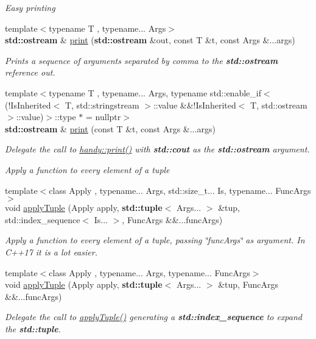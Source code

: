 {\bf }\par
{\em Easy printing }\begin{DoxyCompactItemize}
\item 
{\footnotesize template$<$typename T , typename... Args$>$ }\\{\bf std\+::ostream} \& \hyperlink{namespacehandy_a553ff960ee6b2b0142aecc9ed04ac6bc}{print} ({\bf std\+::ostream} \&out, const T \&t, const Args \&...args)
\begin{DoxyCompactList}\small\item\em Prints a sequence of arguments separated by comma to the {\bf std\+::ostream} reference {\ttfamily out}. \end{DoxyCompactList}\item 
{\footnotesize template$<$typename T , typename... Args, typename std\+::enable\+\_\+if$<$(!\+Is\+Inherited$<$ T, std\+::stringstream $>$\+::value \&\&!\+Is\+Inherited$<$ T, std\+::ostream $>$\+::value)$>$\+::type $\ast$  = nullptr$>$ }\\{\bf std\+::ostream} \& \hyperlink{namespacehandy_acdd8e02922c3b608fd59283bb1d272eb}{print} (const T \&t, const Args \&...args)
\begin{DoxyCompactList}\small\item\em Delegate the call to \hyperlink{namespacehandy_a553ff960ee6b2b0142aecc9ed04ac6bc}{handy\+::print()} with {\bf std\+::cout} as the {\bf std\+::ostream} argument. \end{DoxyCompactList}\end{DoxyCompactItemize}

{\bf }\par
{\em Apply a function to every element of a tuple }\begin{DoxyCompactItemize}
\item 
{\footnotesize template$<$class Apply , typename... Args, std\+::size\+\_\+t... Is, typename... Func\+Args$>$ }\\void \hyperlink{namespacehandy_a80453515558758a8b0b4038b792051b2}{apply\+Tuple} (Apply apply, {\bf std\+::tuple}$<$ Args... $>$ \&tup, std\+::index\+\_\+sequence$<$ Is... $>$, Func\+Args \&\&...func\+Args)
\begin{DoxyCompactList}\small\item\em Apply a function to every element of a tuple, passing \char`\"{}func\+Args\char`\"{} as argument. In C++17 it is a lot easier. \end{DoxyCompactList}\item 
{\footnotesize template$<$class Apply , typename... Args, typename... Func\+Args$>$ }\\void \hyperlink{namespacehandy_a46ed92be2279077a1619d78652a915ce}{apply\+Tuple} (Apply apply, {\bf std\+::tuple}$<$ Args... $>$ \&tup, Func\+Args \&\&...func\+Args)
\begin{DoxyCompactList}\small\item\em Delegate the call to \hyperlink{namespacehandy_a80453515558758a8b0b4038b792051b2}{apply\+Tuple()} generating a {\bf std\+::index\+\_\+sequence } to expand the {\bf std\+::tuple}. \end{DoxyCompactList}\end{DoxyCompactItemize}

